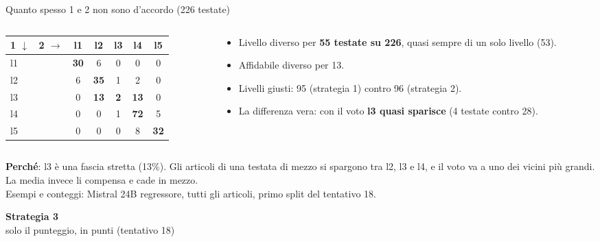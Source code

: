 \documentclass[aspectratio=169]{beamer}
\newcommand{\hl}[1]{\textbf{#1}}
\newcommand{\divider}[2]{%
  \begin{frame}[plain]
    \vfill
    \begin{center}
      {\color{dividerblue}\Huge\textbf{#1}}\\[0.8em]
      {\large #2}
    \end{center}
    \vfill
  \end{frame}}
\newcommand{\errore}[1]{\textcolor{rosso}{\textbf{#1}}}
\begin{document}
\begin{frame}{Quanto spesso 1 e 2 non sono d'accordo (226 testate)}
  \small
  \begin{columns}[T]
    \begin{column}{0.46\textwidth}
      \centering
      \begin{tabular}{l|ccccc}
        \textbf{1 $\downarrow$ \ 2 $\rightarrow$} & l1 & l2 & l3 & l4 & l5 \\
        \midrule
        l1 & \textbf{30} & 6 & 0 & 0 & 0 \\
        l2 & 6 & \textbf{35} & 1 & 2 & 0 \\
        l3 & 0 & \errore{13} & \textbf{2} & \errore{13} & 0 \\
        l4 & 0 & 0 & 1 & \textbf{72} & 5 \\
        l5 & 0 & 0 & 0 & 8 & \textbf{32} \\
      \end{tabular}
    \end{column}
    \begin{column}{0.5\textwidth}
      \begin{itemize}
        \setlength\itemsep{0.4em}
        \item Livello diverso per \hl{55 testate su 226}, quasi sempre di un solo livello (53).
        \item Affidabile diverso per 13.
        \item Livelli giusti: 95 (strategia 1) contro 96 (strategia 2).
        \item La differenza vera: con il voto \hl{l3 quasi sparisce} (4 testate contro 28).
      \end{itemize}
    \end{column}
  \end{columns}
  \vspace{0.8em}
  \raggedright
  \hl{Perch\'e}: l3 \`e una fascia stretta (13\%). Gli articoli di una testata di mezzo si spargono tra l2, l3 e l4, e il voto va
  a uno dei vicini pi\`u grandi. La media invece li compensa e cade in mezzo.\\[0.3em]
  {\scriptsize Esempi e conteggi: Mistral 24B regressore, tutti gli articoli, primo split del tentativo 18.}
\end{frame}

\divider{Strategia 3}{solo il punteggio, in punti (tentativo 18)}
\end{document}
